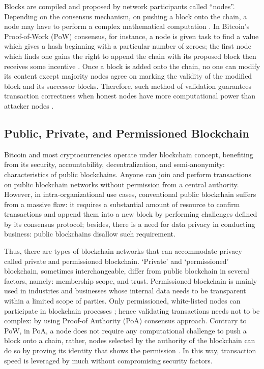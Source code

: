 \documentclass[a4paper,12pt,oneside, utf8x]{report}
\begin{document}
Blocks are compiled and proposed by network participants called “nodes”. Depending on the consensus mechanism, on pushing a block onto the chain, a node may have to perform a complex mathematical computation \cite{a7}. In Bitcoin’s Proof-of-Work (PoW) consensus, for instance, a node is given task to find a value which gives a hash beginning with a particular number of zeroes; the first node which finds one gains the right to append the chain with its proposed block then receives some incentive \cite{a20}. Once a block is added onto the chain, no one can modify its content except majority nodes agree on marking the validity of the modified block and its successor blocks. Therefore, such method of validation guarantees transaction correctness when honest nodes have more computational power than attacker nodes \cite{a7}. 

\subsection{Public, Private, and Permissioned Blockchain}

Bitcoin and most cryptocurrencies operate under blockchain concept, benefiting from its security, accountability, decentralization, and semi-anonymity: characteristics of public blockchains. Anyone can join and perform transactions on public blockchain networks without permission from a central authority. However, in intra-organizational use cases, conventional public blockchain suffers from a massive flaw: it requires a substantial amount of resource to confirm transactions and append them into a new block by performing challenges defined by its consensus protocol; besides, there is a need for data privacy in conducting business: public blockchains disallow such requirement.

Thus, there are types of blockchain networks that can accommodate privacy called private and permissioned blockchain. ‘Private’ and ‘permissioned’ blockchain, sometimes interchangeable, differ from public blockchain in several factors, namely: membership scope, and trust. Permissioned blockchain is mainly used in industries and businesses whose internal data needs to be transparent within a limited scope of parties. Only permissioned, white-listed nodes can participate in blockchain processes \cite{a21}; hence validating transactions needs not to be complex: by using Proof-of Authority (PoA) consensus approach. Contrary to PoW, in PoA, a node does not require any computational challenge to push a block onto a chain, rather, nodes selected by the authority of the blockchain can do so by proving its identity that shows the permission \cite{a5}. In this way, transaction speed is leveraged by much without compromising security factors.
\end{document}
